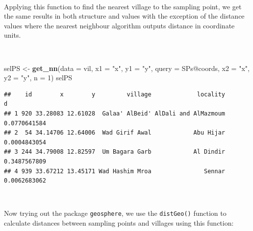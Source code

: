 \documentclass[11pt,a4paper]{article}
\newenvironment{Shaded}{}{}
\newcommand{\KeywordTok}[1]{\textcolor[rgb]{0.00,0.44,0.13}{\textbf{#1}}}
\newcommand{\DataTypeTok}[1]{\textcolor[rgb]{0.56,0.13,0.00}{#1}}
\newcommand{\DecValTok}[1]{\textcolor[rgb]{0.25,0.63,0.44}{#1}}
\newcommand{\StringTok}[1]{\textcolor[rgb]{0.25,0.44,0.63}{#1}}
\newcommand{\OperatorTok}[1]{\textcolor[rgb]{0.40,0.40,0.40}{#1}}
\newcommand{\NormalTok}[1]{#1}
\begin{document}
~

Applying this function to find the nearest village to the sampling
point, we get the same results in both structure and values with the
exception of the distance values where the nearest neighbour algorithm
outputs distance in coordinate units.

~

\begin{Shaded}
\begin{Highlighting}[]
\NormalTok{selPS <-}\StringTok{ }\KeywordTok{get_nn}\NormalTok{(}\DataTypeTok{data =}\NormalTok{ vil, }\DataTypeTok{x1 =} \StringTok{"x"}\NormalTok{, }\DataTypeTok{y1 =} \StringTok{"y"}\NormalTok{, }
                \DataTypeTok{query =}\NormalTok{ SPs}\OperatorTok{@}\NormalTok{coords, }\DataTypeTok{x2 =} \StringTok{"x"}\NormalTok{, }\DataTypeTok{y2 =} \StringTok{"y"}\NormalTok{, }
                \DataTypeTok{n =} \DecValTok{1}\NormalTok{)}
\NormalTok{selPS}
\end{Highlighting}
\end{Shaded}

\begin{verbatim}
##    id        x        y         village             locality            d
## 1 920 33.28083 12.61028  Galaa' AlBeid' AlDali and AlMazmoum 0.0770641584
## 2  54 34.14706 12.64006  Wad Girif Awal            Abu Hijar 0.0004843054
## 3 244 34.79008 12.82597  Um Bagara Garb            Al Dindir 0.3487567809
## 4 939 33.67212 13.45171 Wad Hashim Mroa               Sennar 0.0062683062
\end{verbatim}

~

Now trying out the package \texttt{geosphere}, we use the
\texttt{distGeo()} function to calculate distances between sampling
points and villages using this function:

~
\end{document}
